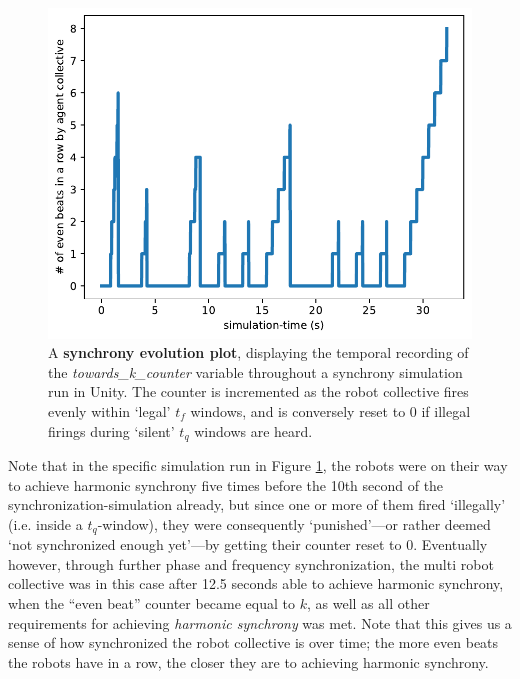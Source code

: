 	\begin{figure}[h]
		\centering
		\includegraphics[width=0.85\linewidth]{Assets/DocSegments/Chapters/ExperimentsAndResults/Figures/Explanations/SynchronyEvolutionPlot.pdf}
		\caption[Simulation run plot: harmonic synchrony evolution plot.]{A \textbf{synchrony evolution plot}, displaying the temporal recording of the \textit{towards\_k\_counter} variable throughout a synchrony simulation run in Unity. The counter is incremented as the robot collective fires evenly within `legal' $t_f$ windows, and is conversely reset to 0 if illegal firings during `silent' $t_q$ windows are heard.}
		\label{fig:harmonic_synch_evolution}
	\end{figure}

	Note that in the specific simulation run in Figure \ref{fig:harmonic_synch_evolution}, the robots were on their way to achieve harmonic synchrony five times before the 10th second of the synchronization-simulation already, but since one or more of them fired `illegally' (i.e. inside a $t_q$-window), they were consequently `punished'—or rather deemed `not synchronized enough yet'—by getting their counter reset to 0. Eventually however, through further phase and frequency synchronization, the multi robot collective was in this case after 12.5 seconds able to achieve harmonic synchrony, when the ``even beat'' counter became equal to $k$, as well as all other requirements for achieving \textit{harmonic synchrony} was met. Note that this gives us a sense of how synchronized the robot collective is over time; the more even beats the robots have in a row, the closer they are to achieving harmonic synchrony.



